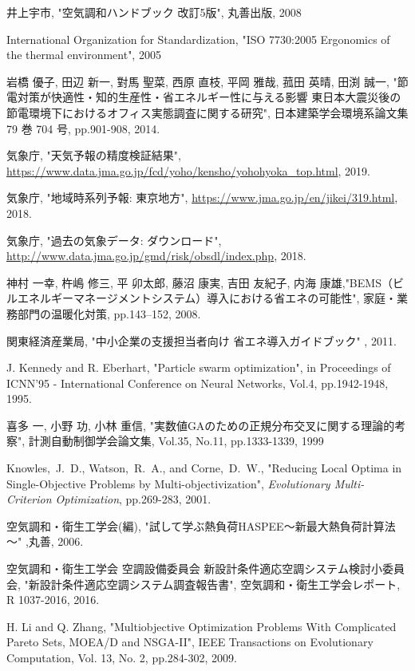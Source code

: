 \begin{thebibliography}{99}
     井上宇市, "空気調和ハンドブック 改訂5版", 丸善出版, 2008

     International Organization for Standardization, "ISO 7730:2005 Ergonomics of the thermal environment", 2005

     岩橋 優子, 田辺 新一, 對馬 聖菜, 西原 直枝, 平岡 雅哉, 菰田 英晴, 田渕 誠一, "節電対策が快適性・知的生産性・省エネルギー性に与える影響 東日本大震災後の節電環境下におけるオフィス実態調査に関する研究", 日本建築学会環境系論文集 79 巻 704 号, pp.901-908, 2014.

     気象庁, "天気予報の精度検証結果", \url{https://www.data.jma.go.jp/fcd/yoho/kensho/yohohyoka_top.html}, 2019.

     気象庁, "地域時系列予報: 東京地方", \url{https://www.jma.go.jp/en/jikei/319.html}, 2018.

     気象庁, "過去の気象データ: ダウンロード", \url{http://www.data.jma.go.jp/gmd/risk/obsdl/index.php}, 2018.

     神村 一幸, 杵嶋 修三, 平 卯太郎, 藤沼 康実, 吉田 友紀子, 内海 康雄,"BEMS（ビルエネルギーマネージメントシステム）導入における省エネの可能性", 家庭・業務部門の温暖化対策, pp.143–152, 2008.

     関東経済産業局, "中小企業の支援担当者向け 省エネ導入ガイドブック" , 2011.

     J. Kennedy and R. Eberhart, "Particle swarm optimization", in Proceedings of ICNN'95 - International Conference on Neural Networks, Vol.4, pp.1942-1948, 1995.

     喜多 一, 小野 功, 小林 重信, "実数値GAのための正規分布交叉に関する理論的考察", 計測自動制御学会論文集, Vol.35, No.11, pp.1333-1339, 1999

     Knowles,~J.~D., Watson,~R.~A., and Corne,~D.~W., "Reducing Local Optima in Single-Objective Problems by Multi-objectivization", {\em Evolutionary Multi-Criterion Optimization}, pp.269-283, 2001.

     空気調和・衛生工学会(編), "試して学ぶ熱負荷HASPEE～新最大熱負荷計算法～" ,丸善, 2006.

     空気調和・衛生工学会 空調設備委員会 新設計条件適応空調システム検討小委員会, "新設計条件適応空調システム調査報告書", 空気調和・衛生工学会レポート, R 1037-2016, 2016.

     H. Li and Q. Zhang, "Multiobjective Optimization Problems With Complicated Pareto Sets, MOEA/D and NSGA-II", IEEE Transactions on Evolutionary Computation, Vol. 13, No. 2, pp.284-302, 2009.


\end{thebibliography}

